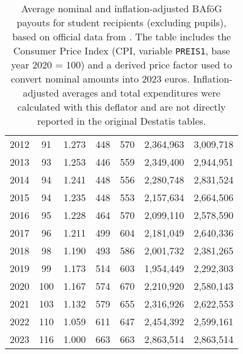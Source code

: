 \begin{table}[H]
\begin{tabular}{rcc|rr|rr}
  2012 & 91 & 1.273 & 448 & 570 & 2,364,963 & 3,009,718 \\
  2013 & 93 & 1.253 & 446 & 559 & 2,349,400 & 2,944,951 \\
  2014 & 94 & 1.241 & 448 & 556 & 2,280,748 & 2,831,524 \\
  2015 & 94 & 1.235 & 448 & 553 & 2,157,634 & 2,664,506 \\
  2016 & 95 & 1.228 & 464 & 570 & 2,099,110 & 2,578,590 \\
  2017 & 96 & 1.211 & 499 & 604 & 2,181,049 & 2,640,336 \\
  2018 & 98 & 1.190 & 493 & 586 & 2,001,732 & 2,381,265 \\
  2019 & 99 & 1.173 & 514 & 603 & 1,954,449 & 2,292,303 \\
  2020 & 100 & 1.167 & 574 & 670 & 2,210,920 & 2,580,143 \\
  2021 & 103 & 1.132 & 579 & 655 & 2,316,926 & 2,622,553 \\
  2022 & 110 & 1.059 & 611 & 647 & 2,454,392 & 2,599,161 \\
  2023 & 116 & 1.000 & 663 & 663 & 2,863,514 & 2,863,514 \\
  \bottomrule
  \end{tabular}
    \caption{\small{
      Average nominal and inflation-adjusted BAföG payouts for student recipients (excluding pupils), based on official data from \cite{destatis_bafoeg_data}.  
      The table includes the Consumer Price Index (CPI, variable \texttt{PREIS1}, base year 2020 = 100) and a derived price factor used to convert nominal amounts into 2023 euros.  
      Inflation-adjusted averages and total expenditures were calculated with this deflator and are not directly reported in the original Destatis tables.
    }}
  \label{table:payout_over_time}
  \end{table}
\endgroup


